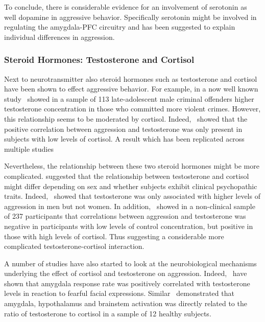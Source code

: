 To conclude, there is considerable evidence for an involvement of serotonin as well dopamine in aggressive behavior.
Specifically serotonin might be involved in regulating the amygdala-PFC circuitry and has been suggested to explain individual differences in aggression.

\subsubsection{Steroid Hormones: Testosterone and Cortisol}
\label{ssub:steriod_hormones_testosteron_and_cortisol}

Next to neurotransmitter also steroid hormones such as testosterone and cortisol have been shown to effect aggressive behavior.
For example, in a now well known study~\citet{Dabbes1991} showed in a sample of 113 late-adolescent male criminal offenders higher testosterone concentration in those who committed more violent crimes.
However, this relationship seems to be moderated by cortisol.
Indeed,~\citet{Dabbes1991} showed that the positive correlation between aggression and testosterone was only present in subjects with low levels of cortisol.
A result which has been replicated across multiple studies~\cite{Popma2007,Rosell2015,Kuepper2010}

Nevertheless, the relationship between these two steroid hormones might be more complicated.
\citet{Rosell2015} suggested that the relationship between testosterone and cortisol might differ depending on sex and whether subjects exhibit clinical psychopathic traits.
Indeed,~\citet{Kuepper2010} showed that testosterone was only associated with higher levels of aggression in men but not women.
In addition,~\citet{Welker2014} showed in a non-clinical sample of 237 participants that correlations between aggression and testosterone was negative in participants with low levels of control concentration, but positive in those with high levels of cortisol.
Thus suggesting a considerable more complicated testosterone-cortisol interaction.

A number of studies have also started to look at the neurobiological mechanisms underlying the effect of cortisol and testosterone on aggression.
Indeed,~\citet{Derntl2009} have shown that amygdala response rate was positively correlated with testosterone levels in reaction to fearful facial expressions.
Similar~\citet{Hermans2008} demonstrated that amygdala, hypothalamus and brainstem activation was directly related to the ratio of testosterone to cortisol in a sample of 12 healthy subjects.


